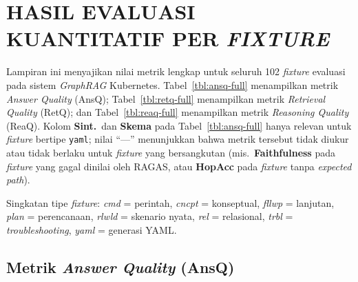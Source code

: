\cleardoublepage
\chapter{HASIL EVALUASI KUANTITATIF PER \textit{FIXTURE}}

Lampiran ini menyajikan nilai metrik lengkap untuk seluruh 102 \textit{fixture} evaluasi pada sistem \textit{GraphRAG} Kubernetes. Tabel~\ref{tbl:ansq-full} menampilkan metrik \textit{Answer Quality} (AnsQ); Tabel~\ref{tbl:retq-full} menampilkan metrik \textit{Retrieval Quality} (RetQ); dan Tabel~\ref{tbl:reaq-full} menampilkan metrik \textit{Reasoning Quality} (ReaQ). Kolom \textbf{Sint.}\ dan \textbf{Skema} pada Tabel~\ref{tbl:ansq-full} hanya relevan untuk \textit{fixture} bertipe \texttt{yaml}; nilai ``---'' menunjukkan bahwa metrik tersebut tidak diukur atau tidak berlaku untuk \textit{fixture} yang bersangkutan (mis.\ \textbf{Faithfulness} pada \textit{fixture} yang gagal dinilai oleh RAGAS, atau \textbf{HopAcc} pada \textit{fixture} tanpa \textit{expected path}).

Singkatan tipe \textit{fixture}: \textit{cmd} = perintah, \textit{cncpt} = konseptual, \textit{fllwp} = lanjutan, \textit{plan} = perencanaan, \textit{rlwld} = skenario nyata, \textit{rel} = relasional, \textit{trbl} = \textit{troubleshooting}, \textit{yaml} = generasi YAML.

\section{Metrik \textit{Answer Quality} (AnsQ)}

